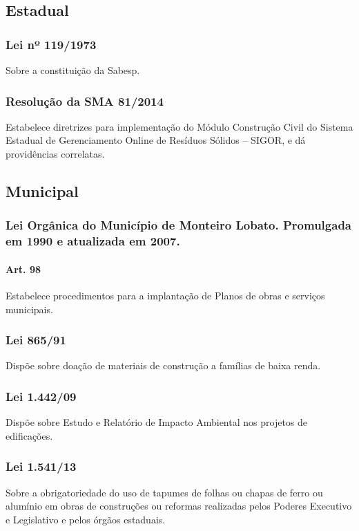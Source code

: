 \begin{subapend}
	\subsection{Estadual}
	\begin{subsubapend}
		\item \subsubsection{Lei nº 119/1973}
		Sobre a constituição da Sabesp.
		\subsubsection{Resolução da SMA 81/2014}
		Estabelece diretrizes para implementação do Módulo Construção Civil do Sistema Estadual de Gerenciamento Online de Resíduos Sólidos – SIGOR, e dá providências correlatas.
		\subsection{Municipal}
		\subsubsection{Lei Orgânica do Município de Monteiro Lobato. Promulgada em 1990 e atualizada em 2007.}
		\paragraph {Art. 98} Estabelece procedimentos para a implantação de Planos de obras e serviços municipais.
		\subsubsection{Lei 865/91}
		Dispõe sobre doação de materiais de construção a famílias de baixa renda.
		\subsubsection{Lei 1.442/09}
		Dispõe sobre Estudo e Relatório de Impacto Ambiental nos projetos de edificações.
		\subsubsection{Lei 1.541/13}
		Sobre a obrigatoriedade do uso de tapumes de folhas ou chapas de ferro ou alumínio em obras de construções ou reformas realizadas pelos Poderes Executivo e Legislativo e pelos órgãos estaduais.
	\end{subsubapend}
\end{subapend}



